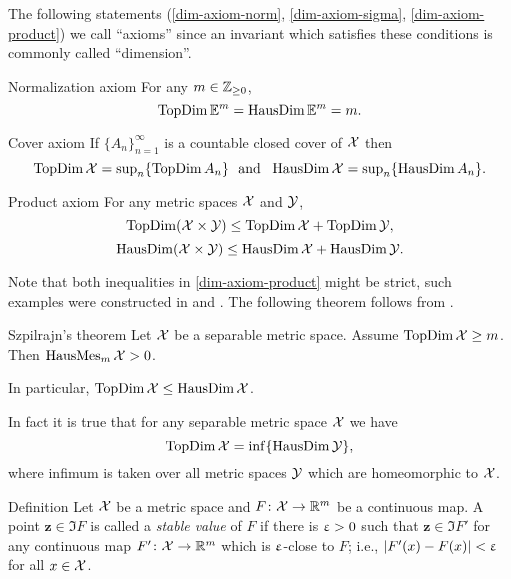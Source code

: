 The following statements (\ref{dim-axiom-norm}, \ref{dim-axiom-sigma}, \ref{dim-axiom-product}) we call ``axioms'' 
since an invariant which satisfies these conditions is commonly called ``dimension''.

\begin{thm}{Normalization axiom}
\label{dim-axiom-norm} For any $m\in\ZZ_{\ge0}$,
\[\mathop{\rm TopDim}\nolimits\mathbb{E}^m=\mathop{\rm HausDim}\nolimits\mathbb{E}^m=m.\]

\end{thm}

\begin{thm}{Cover axiom}
 \label{dim-axiom-sigma} If $\{A_n\}_{n=1}^\infty$ is a countable closed cover of $\mathcal{X}$ then
 \[\TopDim \spc{X}=\sup\nolimits_n\{\TopDim A_n\}\ \ \text{and}\ \ \HausDim \spc{X}=\sup\nolimits_n\{\HausDim A_n\}.\]

\end{thm}

\begin{thm}{Product axiom}\label{dim-axiom-product}
For any metric spaces $\mathcal{X}$ and $\mathcal{Y}$,
\[\TopDim  (\spc{X}\times\spc{Y})
\le 
\TopDim \spc{X}+ \TopDim\spc{Y},\]
\[\HausDim (\spc{X}\times\spc{Y})
\le 
\HausDim \spc{X}+ \HausDim\spc{Y}.\]

\end{thm}

Note that both inequalities in \ref{dim-axiom-product} might be strict, such examples were constructed in \cite{pontyagin-surface} and \cite{marstrand-hausdim}%
.
The following theorem follows from \cite[theorems V 8 and VII 2]{top-dim}.

\begin{thm}{Szpilrajn's theorem}\label{thm:szpilrajn} 
Let $\mathcal{X}$ be a separable metric space.
Assume $\TopDim\spc{X}\ge m$. Then $\mathop{\rm HausMes}\nolimits_m \mathcal{X}>0$.

In particular, 
$\TopDim\spc{X}\le\HausDim\spc{X}$.
\end{thm}

In fact it is true that for any separable metric space $\mathcal{X}$ we have
\[\mathop{\rm TopDim}\nolimits\mathcal{X}=\inf\{\mathop{\rm HausDim}\nolimits\mathcal{Y}\},\]
where infimum is taken over all metric spaces $\mathcal{Y}$ which are homeomorphic to $\mathcal{X}$.

\begin{thm}{Definition}
Let $\mathcal{X}$ be a metric space
and $F\:\spc{X}\to\RR^m$ be  a continuous map.
A point $\bm{z}\in \Im F$ is called a  \emph{stable value} of $F$
if there is $\upvarepsilon>0$ such that $\bm{z}\in\Im F'$ 
for any continuous map $F'\:\spc{X}\to\RR^m$ which is $\upvarepsilon$-close to $F$;
i.e., $|F'(x)-F(x)|<\upvarepsilon$ for all $x\in \spc{X}$.
\end{thm}

